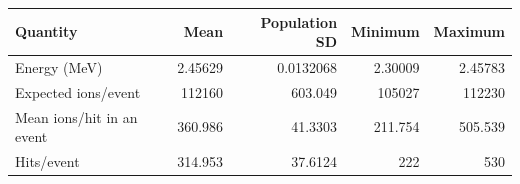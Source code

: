 \begin{tabular}{lrrrr}\toprule
Quantity & Mean & Population SD & Minimum & Maximum \\\midrule
Energy (MeV) & \num{2.45629} & \num{0.0132068} & \num{2.30009} & \num{2.45783} \\
Expected ions/event & \num{112160} & \num{603.049} & \num{105027} & \num{112230} \\
Mean ions/hit in an event & \num{360.986} & \num{41.3303} & \num{211.754} & \num{505.539} \\
Hits/event & \num{314.953} & \num{37.6124} & \num{222} & \num{530} \\
\bottomrule\end{tabular}
